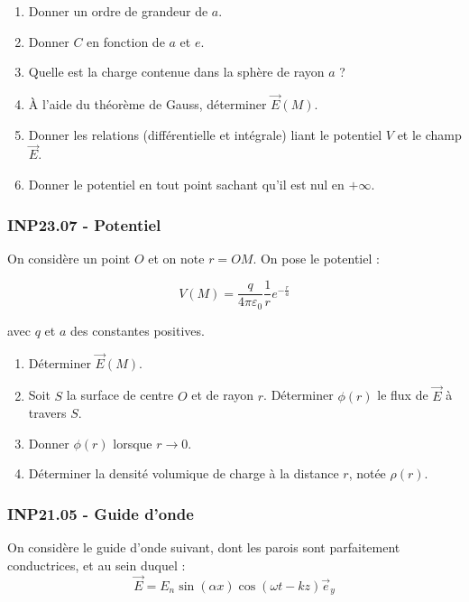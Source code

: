 \begin{enumerate}
    \item Donner un ordre de grandeur de $a$.
    \item Donner $C$ en fonction de $a$ et $e$.
    \item Quelle est la charge contenue dans la sphère de rayon $a$ ?
    \item À l'aide du théorème de Gauss, déterminer $\overrightarrow{E}(M)$.
    \item Donner les relations (différentielle et intégrale) liant le potentiel $V$ et le champ $\overrightarrow{E}$.
    \item Donner le potentiel en tout point sachant qu'il est nul en $+\infty$.
\end{enumerate}

\subsubsection*{INP23.07 - Potentiel  \lesdeux}

On considère un point $O$ et on note $r = OM$. On pose le potentiel :

\[
V(M) = \frac{q}{4\pi\varepsilon_0} \frac{1}{r} e^{-\frac{r}{a}}
\]

avec $q$ et $a$ des constantes positives.

\begin{enumerate}
    \item Déterminer $\overrightarrow{E}(M)$.
    \item Soit $S$ la surface de centre $O$ et de rayon $r$. Déterminer $\phi(r)$ le flux de $\overrightarrow{E}$ à travers $S$.
    \item Donner $\phi(r)$ lorsque $r \rightarrow 0$.
    \item Déterminer la densité volumique de charge à la distance $r$, notée $\rho(r)$.
\end{enumerate}
\newpage
\subsubsection*{INP21.05 - Guide d'onde  \lesdeux}

On considère le guide d'onde suivant, dont les parois sont parfaitement conductrices, et au sein duquel :
\[
\overrightarrow{E} = E_n \sin(\alpha x) \cos(\omega t - kz) \vec{e}_y
\]

